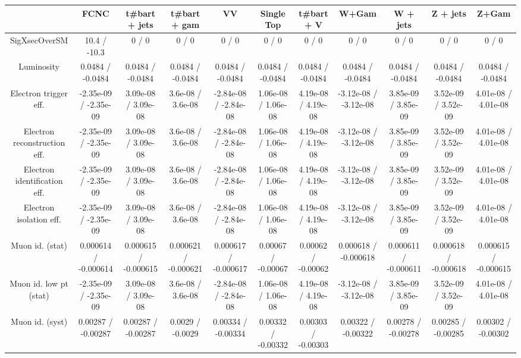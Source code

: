 \begin{table}[htbp]
\begin{center}
\footnotesize
\begin{tabular}{|c|c|c|c|c|c|c|c|c|c|c|}
\hline 
      & FCNC      & t#bar{t} + jets      & t#bar{t} +  gam      & VV      & Single Top      & t#bar{t} + V      & W+Gam      & W + jets      & Z + jets      & Z+Gam \\ 
\hline 
 SigXsecOverSM & 10.4 / -10.3 & 0 / 0 & 0 / 0 & 0 / 0 & 0 / 0 & 0 / 0 & 0 / 0 & 0 / 0 & 0 / 0 & 0 / 0 \\ 
  Luminosity & 0.0484 / -0.0484 & 0.0484 / -0.0484 & 0.0484 / -0.0484 & 0.0484 / -0.0484 & 0.0484 / -0.0484 & 0.0484 / -0.0484 & 0.0484 / -0.0484 & 0.0484 / -0.0484 & 0.0484 / -0.0484 & 0.0484 / -0.0484 \\ 
  Electron trigger eff. & -2.35e-09 / -2.35e-09 & 3.09e-08 / 3.09e-08 & 3.6e-08 / 3.6e-08 & -2.84e-08 / -2.84e-08 & 1.06e-08 / 1.06e-08 & 4.19e-08 / 4.19e-08 & -3.12e-08 / -3.12e-08 & 3.85e-09 / 3.85e-09 & 3.52e-09 / 3.52e-09 & 4.01e-08 / 4.01e-08 \\ 
  Electron reconstruction eff. & -2.35e-09 / -2.35e-09 & 3.09e-08 / 3.09e-08 & 3.6e-08 / 3.6e-08 & -2.84e-08 / -2.84e-08 & 1.06e-08 / 1.06e-08 & 4.19e-08 / 4.19e-08 & -3.12e-08 / -3.12e-08 & 3.85e-09 / 3.85e-09 & 3.52e-09 / 3.52e-09 & 4.01e-08 / 4.01e-08 \\ 
  Electron identification eff. & -2.35e-09 / -2.35e-09 & 3.09e-08 / 3.09e-08 & 3.6e-08 / 3.6e-08 & -2.84e-08 / -2.84e-08 & 1.06e-08 / 1.06e-08 & 4.19e-08 / 4.19e-08 & -3.12e-08 / -3.12e-08 & 3.85e-09 / 3.85e-09 & 3.52e-09 / 3.52e-09 & 4.01e-08 / 4.01e-08 \\ 
  Electron isolation eff. & -2.35e-09 / -2.35e-09 & 3.09e-08 / 3.09e-08 & 3.6e-08 / 3.6e-08 & -2.84e-08 / -2.84e-08 & 1.06e-08 / 1.06e-08 & 4.19e-08 / 4.19e-08 & -3.12e-08 / -3.12e-08 & 3.85e-09 / 3.85e-09 & 3.52e-09 / 3.52e-09 & 4.01e-08 / 4.01e-08 \\ 
  Muon id. (stat) & 0.000614 / -0.000614 & 0.000615 / -0.000615 & 0.000621 / -0.000621 & 0.000617 / -0.000617 & 0.00067 / -0.00067 & 0.00062 / -0.00062 & 0.000618 / -0.000618 & 0.000611 / -0.000611 & 0.000618 / -0.000618 & 0.000615 / -0.000615 \\ 
  Muon id. low pt (stat) & -2.35e-09 / -2.35e-09 & 3.09e-08 / 3.09e-08 & 3.6e-08 / 3.6e-08 & -2.84e-08 / -2.84e-08 & 1.06e-08 / 1.06e-08 & 4.19e-08 / 4.19e-08 & -3.12e-08 / -3.12e-08 & 3.85e-09 / 3.85e-09 & 3.52e-09 / 3.52e-09 & 4.01e-08 / 4.01e-08 \\ 
  Muon id. (syst) & 0.00287 / -0.00287 & 0.00287 / -0.00287 & 0.0029 / -0.0029 & 0.00334 / -0.00334 & 0.00332 / -0.00332 & 0.00303 / -0.00303 & 0.00322 / -0.00322 & 0.00278 / -0.00278 & 0.00285 / -0.00285 & 0.00302 / -0.00302 \\ 

\end{tabular}
\end{center}
\end{table}
